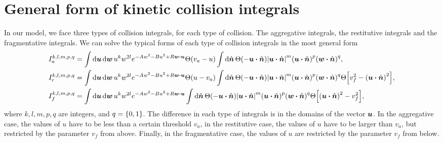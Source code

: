 \documentclass[aps,prl,preprint,groupedaddress,10pt]{revtex4-2}
\begin{document}
\section{General form of kinetic collision integrals}
In our model, we face three types of collision integrals, for each type of collision.
The aggregative integrals, the restitutive integrals and the fragmentative integrals.
We can solve the typical forms of each type of collision integrals in the most general form
\begin{equation}
    \begin{split}
        I_a^{k,l,m,p,q} &= \int\dd{\bu}\dd{\bw}u^kw^{2l}
        e^{-Aw^2-Bu^2+R\bw\vdot\bu}\Theta\pqty{v_a-u}
        \int\dd{\bn}\Theta\pqty{-\bu\vdot\bn}\abs{\bu\vdot\bn}^m
        \pqty{\bu\vdot\bn}^p\pqty{\bw\vdot\bn}^q,\\
        I_r^{k,l,m,p,q} &= \int\dd{\bu}\dd{\bw}u^kw^{2l}
        e^{-Aw^2-Bu^2+R\bw\vdot\bu}\Theta\pqty{u-v_a}
        \int\dd{\bn}\Theta\pqty{-\bu\vdot\bn}\abs{\bu\vdot\bn}^m
        \pqty{\bu\vdot\bn}^p\pqty{\bw\vdot\bn}^q
        \Theta\bqty{v_f^2-\pqty{\bu\vdot\bn}^2},\\
        I_f^{k,l,m,p,q} &= \int\dd{\bu}\dd{\bw}u^kw^{2l}
        e^{-Aw^2-Bu^2+R\bw\vdot\bu}
        \int\dd{\bn}\Theta\pqty{-\bu\vdot\bn}\abs{\bu\vdot\bn}^m
        \pqty{\bu\vdot\bn}^p\pqty{\bw\vdot\bn}^q
        \Theta\bqty{\pqty{\bu\vdot\bn}^2-v_f^2},\\
    \end{split}
\end{equation}
where $k,l,m,p,q$ are integers, and $q=\Bqty{0,1}$. The difference in each type of
integrals is in the domains of the vector $\vb*{u}$. In the aggregative case, the values of
$u$ have to be less than a certain threshold $v_a$, in the restitutive case, the
values of $u$ have to be larger than $v_a$, but restricted by the parameter
$v_f$ from above. Finally, in the fragmentative case, the values of $u$ are restricted
by the parameter $v_f$ from below.
\end{document}
